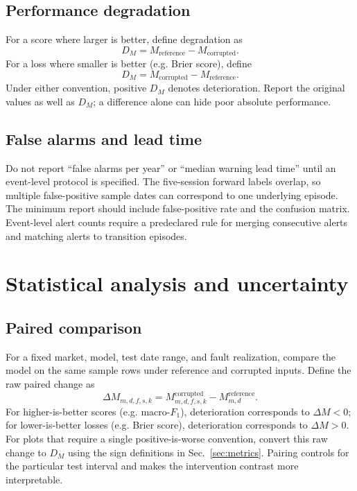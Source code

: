 \documentclass[11pt,a4paper]{article}
\begin{document}
\subsection{Performance degradation}

For a score where larger is better, define degradation as
\begin{equation}
  D_M=M_{\mathrm{reference}}-M_{\mathrm{corrupted}}.
\end{equation}
For a loss where smaller is better (e.g. Brier score), define
\begin{equation}
  D_M=M_{\mathrm{corrupted}}-M_{\mathrm{reference}}.
\end{equation}
Under either convention, positive $D_M$ denotes deterioration. Report the original values as well as $D_M$; a difference alone can hide poor absolute performance.

\subsection{False alarms and lead time}

Do not report ``false alarms per year'' or ``median warning lead time'' until an event-level protocol is specified. The five-session forward labels overlap, so multiple false-positive sample dates can correspond to one underlying episode. The minimum report should include false-positive rate and the confusion matrix. Event-level alert counts require a predeclared rule for merging consecutive alerts and matching alerts to transition episodes.

\section{Statistical analysis and uncertainty}
\label{sec:stats}

\subsection{Paired comparison}

For a fixed market, model, test date range, and fault realization, compare the model on the same sample rows under reference and corrupted inputs. Define the raw paired change as
\begin{equation}
  \Delta M_{m,d,f,s,k}
  =M_{m,d,f,s,k}^{\mathrm{corrupted}}
  -M_{m,d}^{\mathrm{reference}}.
\end{equation}
For higher-is-better scores (e.g. macro-$F_1$), deterioration corresponds to $\Delta M<0$; for lower-is-better losses (e.g. Brier score), deterioration corresponds to $\Delta M>0$. For plots that require a single positive-is-worse convention, convert this raw change to $D_M$ using the sign definitions in Sec.~\ref{sec:metrics}. Pairing controls for the particular test interval and makes the intervention contrast more interpretable.
\end{document}

